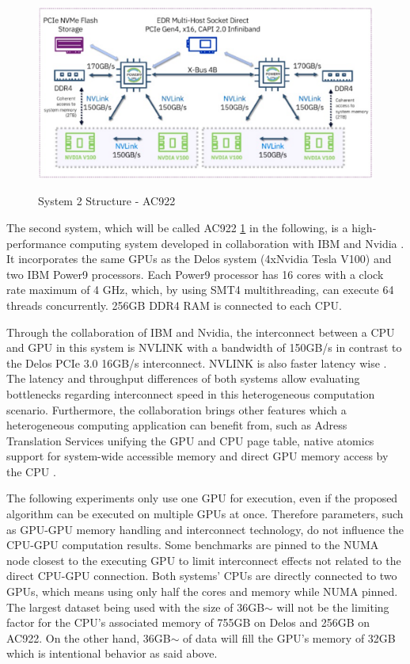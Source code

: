\begin{figure}[H]
  \caption{System 2 Structure - AC922 \cite{ganesannarayanasamyPowerAIDeepDive12:39:24UTC}}
  \includegraphics[width=\textwidth]{figures/ac922_system_arch.png}
  \centering
  \label{fig:ac922_arch}
\end{figure}

The second system, which will be called AC922 \ref{fig:ac922_arch} in the following, is a high-performance computing system developed in collaboration with IBM and Nvidia \cite{caldeiraIBMPowerSystem}. It incorporates the same GPUs as the Delos system (4xNvidia Tesla V100) and two IBM Power9 processors. Each Power9 processor has 16 cores with a clock rate maximum of 4 GHz, which, by using SMT4 multithreading, can execute 64 threads concurrently. 256GB DDR4 RAM is connected to each CPU.

Through the collaboration of IBM and Nvidia, the interconnect between a CPU and GPU in this system is NVLINK \cite{NVLink2021, zargesEvaluationOnNodeGPU} with a bandwidth of 150GB/s in contrast to the Delos PCIe 3.0 16GB/s interconnect. NVLINK is also faster latency wise \cite{liEvaluatingModernGPU2020}. The latency and throughput differences of both systems allow evaluating bottlenecks regarding interconnect speed in this heterogeneous computation scenario.
Furthermore, the collaboration brings other features which a heterogeneous computing application can benefit from, such as Adress Translation Services \cite{ibmpower9nputeamFunctionalityPerformanceNVLink2018} unifying the GPU and CPU page table, native atomics support for system-wide accessible memory and direct GPU memory access by the CPU \cite{UNIFIEDMEMORYP9}.

The following experiments only use one GPU for execution, even if the proposed algorithm can be executed on multiple GPUs at once. Therefore parameters, such as GPU-GPU memory handling and interconnect technology, do not influence the CPU-GPU computation results. Some benchmarks are pinned to the NUMA node closest to the executing GPU to limit interconnect effects not related to the direct CPU-GPU connection. Both systems' CPUs are directly connected to two GPUs, which means using only half the cores and memory while NUMA pinned. The largest dataset being used with the size of 36GB$\sim$ will not be the limiting factor for the CPU's associated memory of 755GB on Delos and 256GB on AC922. On the other hand, 36GB$\sim$ of data will fill the GPU's memory of 32GB which is intentional behavior as said above.

